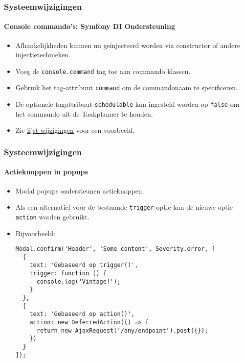 \begin{frame}[fragile]
	\frametitle{Systeemwijzigingen}
	\framesubtitle{Console commando's: Symfony DI Ondersteuning}

	\begin{itemize}
		\item Afhankelijkheden kunnen nu geïnjecteerd worden via constructor of andere injectietechnieken.
		\item Voeg de \texttt{console.command} tag toe aan commando klassen.
		\item Gebruik het tag-attribuut \texttt{command} om de commandonaam te specificeren.
		\item De optionele tagattribuut \texttt{schedulable} kan ingesteld worden op \texttt{false}
			om het commando uit de Taakplanner te houden.

		\item Zie
			\href{https://docs.typo3.org/c/typo3/cms-core/master/en-us/Changelog/10.3/Feature-89139-AddDependencyInjectionSupportForConsoleCommands.html}{lijst wijzigingen}
			voor een voorbeeld.
	\end{itemize}

\end{frame}


\begin{frame}[fragile]
	\frametitle{Systeemwijzigingen}
	\framesubtitle{Actieknoppen in popups}

	\lstset{basicstyle=\tiny\ttfamily}

	\begin{itemize}
		\item Modal popups ondersteunen actieknoppen.
		\item Als een alternatief voor de bestaande \texttt{trigger}-optie kan de nieuwe
			optie \texttt{action} worden gebruikt.
		\item Bijvoorbeeld:
\begin{lstlisting}
Modal.confirm('Header', 'Some content', Severity.error, [
  {
	text: 'Gebaseerd op trigger()',
    trigger: function () {
      console.log('Vintage!');
    }
  },
  {
	text: 'Gebaseerd op action()',
    action: new DeferredAction(() => {
      return new AjaxRequest('/any/endpoint').post({});
    })
  }
]);
\end{lstlisting}

	\end{itemize}

\end{frame}

